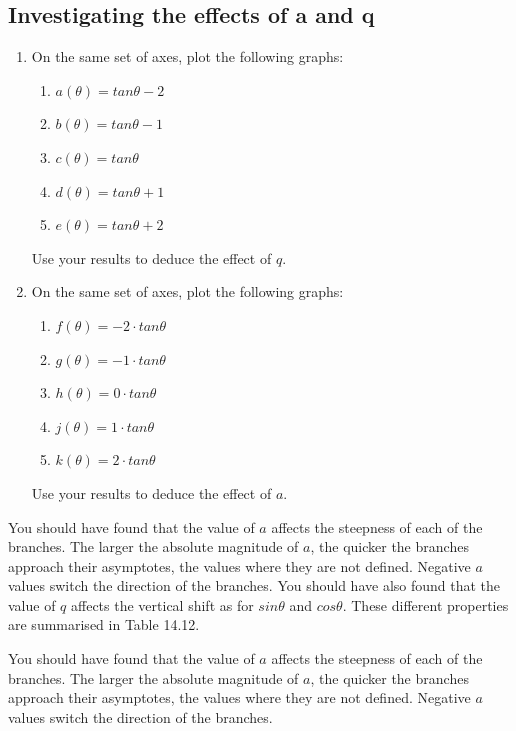 \subsection*{Investigating the effects of a and q}
\nopagebreak
\begin{enumerate}[noitemsep, label=\textbf{\arabic*}. ] 
\item On the same set of axes, plot the following graphs:
\begin{enumerate}[noitemsep, label=\textbf{\alph*}. ] 
\item $a(\theta )=tan\theta -2$
\item $b(\theta )=tan\theta -1$
\item $c(\theta )=tan\theta $
\item $d(\theta )=tan\theta +1$
\item $e(\theta )=tan\theta +2$\end{enumerate}
Use your results to deduce the effect of $q$.
\item On the same set of axes, plot the following graphs:
\begin{enumerate}[noitemsep, label=\textbf{\alph*}. ] 
\item $f(\theta )=-2\ensuremath{\cdot}tan\theta $
\item $g(\theta )=-1\ensuremath{\cdot}tan\theta $
\item $h(\theta )=0\ensuremath{\cdot}tan\theta $
\item $j(\theta )=1\ensuremath{\cdot}tan\theta $
\item $k(\theta )=2\ensuremath{\cdot}tan\theta $\end{enumerate}
Use your results to deduce the effect of $a$.
\end{enumerate}
You should have found that the value of $a$ affects the steepness of each of the branches. The larger the absolute magnitude of $a$, the quicker the branches approach their asymptotes, the values where they are not defined. Negative $\mathit{a}$ values switch the direction of the branches.
You should have also found that the value of $q$ affects the vertical shift as for $sin\theta $ and $cos\theta $.
These different properties are summarised in Table 14.12.\par 
You should have found that the value of $a$ affects the steepness of each of the branches. The larger the absolute magnitude of $a$, the quicker the branches approach their asymptotes, the values where they are not defined. Negative $\mathit{a}$ values switch the direction of the branches.
